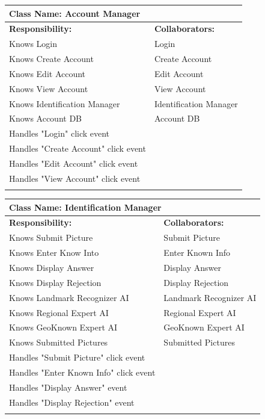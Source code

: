 \documentclass[]{article}
\begin{document}
	\begin{table}[H]
		\centering
		\begin{tabular}{|p{8cm}|p{8cm}|}
		\hline 
		 \multicolumn{2}{|l|}{\textbf{Class Name:} Account Manager} \\
		\hline
		\textbf{Responsibility:} & \textbf{Collaborators:} \\
		\hline
            Knows Login & Login \\
            Knows Create Account & Create Account \\
            Knows Edit Account & Edit Account \\
            Knows View Account & View Account \\
            Knows Identification Manager & Identification Manager \\
            Knows Account DB & Account DB \\
            Handles "Login" click event & \\
            Handles "Create Account" click event & \\
            Handles "Edit Account" click event & \\
            Handles "View Account" click event & \\
		\vspace{1cm} & \\
		\hline
		\end{tabular}
	\end{table}

	\begin{table}[H]
		\centering
		\begin{tabular}{|p{8cm}|p{8cm}|}
		\hline 
		 \multicolumn{2}{|l|}{\textbf{Class Name:} Identification Manager} \\
		\hline
		\textbf{Responsibility:} & \textbf{Collaborators:} \\
		\hline
            Knows Submit Picture & Submit Picture \\
            Knows Enter Know Into & Enter Known Info \\
            Knows Display Answer & Display Answer \\
            Knows Display Rejection & Display Rejection \\
            Knows Landmark Recognizer AI & Landmark Recognizer AI \\
            Knows Regional Expert AI & Regional Expert AI \\
            Knows GeoKnown Expert AI & GeoKnown Expert AI \\
            Knows Submitted Pictures & Submitted Pictures \\
            Handles "Submit Picture" click event & \\
            Handles "Enter Known Info" click event & \\
            Handles "Display Answer" event & \\
            Handles "Display Rejection" event & \\
		\vspace{1cm} & \\
		\hline
		\end{tabular}
	\end{table}
\end{document}
